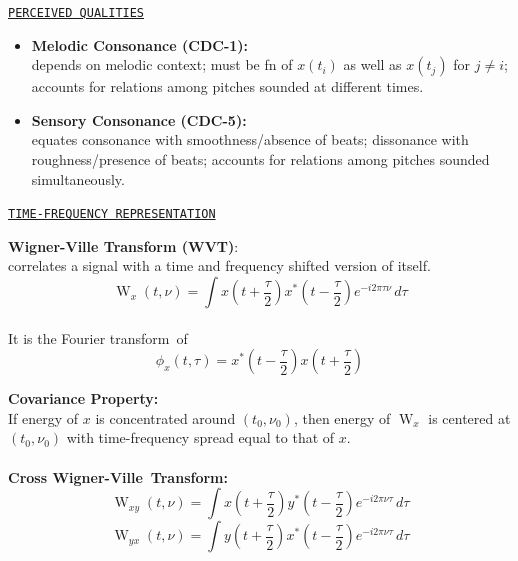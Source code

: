 \documentclass{slides}
\def\W{\operatorname{W}}
\def\halftau{{\scriptstyle \frac{\tau}{2}}}
\def\xtpull{x\left(t+\halftau\right)}
\def\xtpushconj{x^*\left(t-\halftau\right)}
\def\ytpull{y\left(t+\halftau\right)}
\def\ytpushconj{y^*\left(t-\halftau\right)}
\def\FT{Fourier transform}
\def\WV{Wigner-Ville}
\begin{document}
\begin{slide}%
\begin{center}{\tt \underline{PERCEIVED QUALITIES}}\end{center}
\begin{itemize} 
\item {\bf Melodic Consonance (CDC-1):} \\
depends on melodic context; must be fn of $x(t_i)$ as well as 
$x(t_j)$ for $j \neq i$; accounts for relations among pitches sounded at
different times. 
\item {\bf Sensory Consonance (CDC-5):} \\
equates consonance with smoothness/absence of beats;
dissonance with roughness/presence of beats;
accounts for relations among pitches sounded simultaneously.
\end{itemize} 
\end{slide}

\begin{slide}%
\begin{center}{\tt \underline{TIME-FREQUENCY REPRESENTATION}}\end{center}
{\bf Wigner-Ville Transform (WVT)}:\\
correlates a signal with a time and frequency
shifted version of itself.\\
\begin{equation*} %
\W_x(t,\nu) = 
\int \xtpull \xtpushconj e^{-i2\pi \tau\nu}\,d\tau
\end{equation*}
\\
It is the \FT\ of
\[
\phi_x(t,\tau) = \xtpushconj \xtpull
\]
\end{slide}

\begin{slide}%
{\bf Covariance Property:} \\
If energy of $x$ is concentrated around $(t_0,\nu_0)$, then energy of $\W_x$ is centered at
$(t_0,\nu_0)$ with time-frequency spread equal to that of $x$.  \\
\\
{\bf Cross \WV\ Transform:} %
\[
  \W_{xy}(t,\nu) = \int \xtpull \ytpushconj e^{-i2\pi\nu\tau}\,d\tau 
\]
\[
  \W_{yx}(t,\nu) = \int \ytpull \xtpushconj e^{-i2\pi\nu\tau}\,d\tau 
\]
\end{slide}
\end{document}

